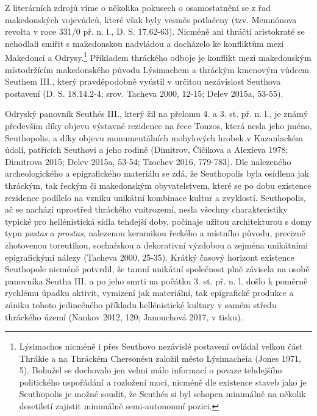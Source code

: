 Z literárních zdrojů víme o několika pokusech o osamostatnění se z řad makedonských vojevůdců, které však byly vesměs potlačeny (tzv. Memnónova revolta v roce 331/0 př. n. l., D. S. 17.62-63). Nicméně ani thráčtí aristokraté se nehodlali smířit s makedonskou nadvládou a docházelo ke konfliktům mezi Makedonci a Odrysy.\footnote{Lýsimachos nicméně i přes Seuthovo nezávislé postavení ovládal velkou část Thrákie a na Thráckém Chersonésu založil město Lýsimacheia (Jones 1971, 5). Bohužel se dochovalo jen velmi málo informací o povaze tehdejšího politického uspořádání a rozložení moci, nicméně dle existence staveb jako je Seuthopolis je možné soudit, že Seuthés si byl schopen minimálně na několik desetiletí zajistit minimálně semi-autonomní pozici.} Příkladem thráckého odboje je konflikt mezi makedonským místodržícím makedonského původu Lýsimachem a thráckým kmenovým vůdcem Seuthem III., který pravděpodobně vyústil v určitou nezávislost Seuthova postavení (D. S. 18.14.2-4; srov. Tacheva 2000, 12-15; Delev 2015a, 53-55).

Odryský panovník Seuthés III., který žil na přelomu 4. a 3. st. př. n. l., je známý především díky objevu výstavné rezidence na řece Tonzos, která nesla jeho jméno, Seuthopolis, a díky objevu monumentálních mohylových hrobek v Kazanlackém údolí, patřících Seuthovi a jeho rodině (Dimitrov, Čičikova a Alexieva 1978; Dimitrova 2015; Delev 2015a, 53-54; Tzochev 2016, 779-783). Dle nalezeného archeologického a epigrafického materiálu se zdá, že Seuthopolis byla osídlena jak thráckým, tak řeckým či makedonským obyvatelstvem, které se po dobu existence rezidence podílelo na vzniku unikátní kombinace kultur a zvyklostí. Seuthopolis, ač se nachází uprostřed thráckého vnitrozemí, nesla všechny charakteristiky typické pro hellénistická sídla tehdejší doby, počínaje užitou architekturou s domy typu {\em pastas} a {\em prostas}, nalezenou keramikou řeckého a místního původu, precizně zhotovenou toreutikou, sochařskou a dekorativní výzdobou a zejména unikátními epigrafickými nálezy (Tacheva 2000, 25-35). Krátký časový horizont existence Seuthopole nicméně potvrdil, že tamní unikátní společnost plně závisela na osobě panovníka Seutha III. a po jeho smrti na počátku 3. st. př. n. l. došlo k poměrně rychlému úpadku aktivit, vymizení jak materiální, tak epigrafické produkce a zániku tohoto jedinečného příkladu hellénistické kultury v samém středu thráckého území (Nankov 2012, 120; Janouchová 2017, v tisku).

